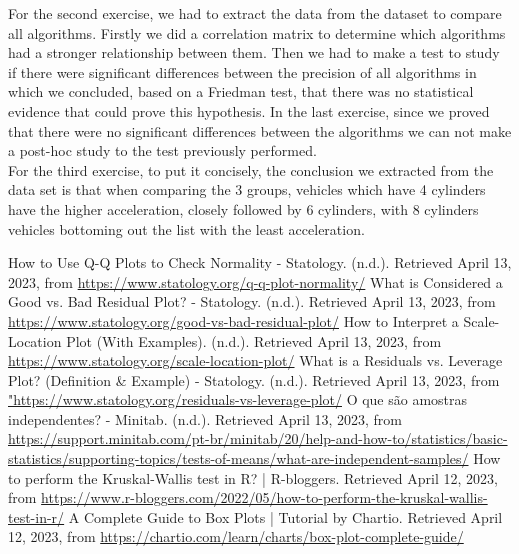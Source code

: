 \documentclass[conference]{IEEEtran}
\begin{document}
For the second exercise, we had to extract the data from the dataset to compare all algorithms. Firstly we did a correlation matrix to determine which algorithms had a stronger relationship between them. Then we had to make a test to study if there were significant differences between the precision of all algorithms in which we concluded, based on a Friedman test, that there was no statistical evidence that could prove this hypothesis. In the last exercise, since we proved that there were no significant differences between the algorithms we can not make a post-hoc study to the test previously performed. \\

For the third exercise, to put it concisely, the conclusion we extracted from the data set is that when comparing the 3 groups, vehicles which have 4 cylinders have the higher acceleration, 
closely followed by 6 cylinders, with 8 cylinders vehicles bottoming out the list with the least acceleration.

\begin{thebibliography}{00}
 How to Use Q-Q Plots to Check Normality - Statology. (n.d.). Retrieved April 13, 2023, from \url{https://www.statology.org/q-q-plot-normality/}
 What is Considered a Good vs. Bad Residual Plot? - Statology. (n.d.). Retrieved April 13, 2023, from \url{https://www.statology.org/good-vs-bad-residual-plot/}
 How to Interpret a Scale-Location Plot (With Examples). (n.d.). Retrieved April 13, 2023, from \url{https://www.statology.org/scale-location-plot/}
 What is a Residuals vs. Leverage Plot? (Definition \& Example) - Statology. (n.d.). Retrieved April 13, 2023, from \url{"https://www.statology.org/residuals-vs-leverage-plot/}
 O que são amostras independentes? - Minitab. (n.d.). Retrieved April 13, 2023, from \url{https://support.minitab.com/pt-br/minitab/20/help-and-how-to/statistics/basic-statistics/supporting-topics/tests-of-means/what-are-independent-samples/}
 How to perform the Kruskal-Wallis test in R? | R-bloggers. Retrieved April 12, 2023, from \url{https://www.r-bloggers.com/2022/05/how-to-perform-the-kruskal-wallis-test-in-r/}
 A Complete Guide to Box Plots | Tutorial by Chartio. Retrieved April 12, 2023, from \url{https://chartio.com/learn/charts/box-plot-complete-guide/}
\end{thebibliography}
\vspace{12pt}
\end{document}
